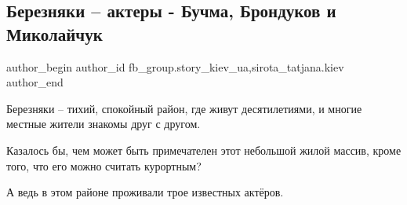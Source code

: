  
 
 
 
 
 
\subsection{Березняки – актеры - Бучма, Брондуков и Миколайчук}
\label{sec:06_11_2021.fb.fb_group.story_kiev_ua.1.bereznjaki_aktery_buchma_brondukov_mykolajchuk}
 
\ifcmt
 author_begin
   author_id fb_group.story_kiev_ua,sirota_tatjana.kiev
 author_end
\fi

Березняки – тихий, спокойный район, где живут десятилетиями, и многие местные
жители знакомы друг с другом.

Казалось бы, чем может быть примечателен этот небольшой жилой массив, кроме
того, что его можно считать курортным?

А ведь в этом районе проживали трое известных актёров.

